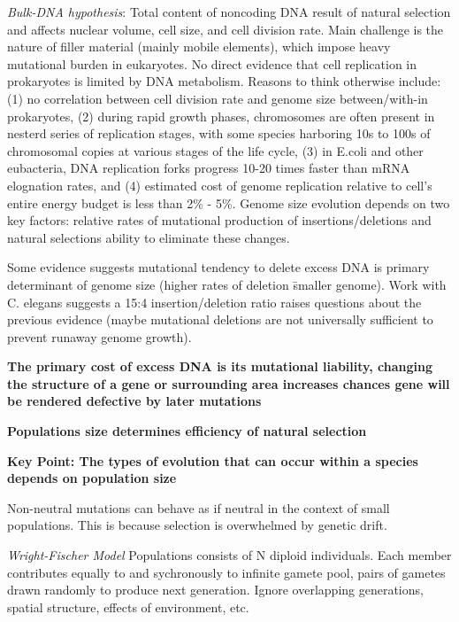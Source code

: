 \documentclass[11pt]{labbook}
\begin{document}
\textit{Bulk-DNA hypothesis}: \newline
Total content of noncoding DNA result of natural selection and affects nuclear volume, cell size, and cell division rate. Main challenge is the nature of filler material (mainly mobile elements), which impose heavy mutational burden in eukaryotes.
\newline
No direct evidence that cell replication in prokaryotes is limited by DNA metabolism.
Reasons to think otherwise include: (1) no correlation between cell division rate and genome size between/with-in prokaryotes, (2) during rapid growth phases, chromosomes are often present in nesterd series of replication stages, with some species harboring 10s to 100s of chromosomal copies at various stages of the life cycle, (3) in E.coli and other eubacteria, DNA replication forks progress 10-20 times faster than mRNA elognation rates, and (4) estimated cost of genome replication relative to cell's entire energy budget is less than 2\% - 5\%. 
\newline
Genome size evolution depends on two key factors: relative rates of mutational production of insertions/deletions and natural selections ability to eliminate these changes.

Some evidence suggests mutational tendency to delete excess DNA is primary determinant of genome size (higher rates of deletion \= smaller genome). Work with C. elegans suggests a 15:4 insertion/deletion ratio raises questions about the previous evidence (maybe mutational deletions are not universally sufficient to prevent runaway genome growth).

\textbf{The primary cost of excess DNA is its mutational liability, changing the structure of a gene or surrounding area increases chances gene will be rendered defective by later mutations}

\textbf{Populations size determines efficiency of natural selection}

\textbf{Key Point: The types of evolution that can occur within a species depends on population size}

Non-neutral mutations can behave as if neutral in the context of small populations. This is because selection is overwhelmed by genetic drift.

\textit{Wright-Fischer Model}
\newline
Populations consists of N diploid individuals. Each member contributes equally to and sychronously to infinite gamete pool, pairs of gametes drawn randomly to produce next generation. Ignore overlapping generations, spatial structure, effects of environment, etc.
\end{document}
